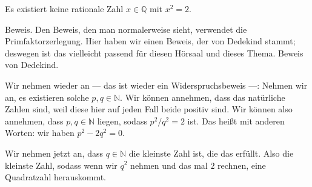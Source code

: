 \begin{math-stroke}
\begin{proposition}\label{prop:sqrt-2-irrational}
Es existiert keine rationale Zahl $x \in \mathbb{Q}$ mit $x^2 = 2$.
\end{proposition}
\end{math-stroke}

\begin{spoken-clean}[00:43:12 - 00:45:42]
Beweis. Den Beweis, den man normalerweise sieht, verwendet die Primfaktorzerlegung. Hier haben wir einen Beweis, der von Dedekind stammt; deswegen ist das vielleicht passend für diesen Hörsaal und dieses Thema. Beweis von Dedekind.

Wir nehmen wieder an --- das ist wieder ein Widerspruchsbeweis ---: Nehmen wir an, es existieren solche $p, q \in \mathbb{N}$. Wir können annehmen, dass das natürliche Zahlen sind, weil diese hier auf jeden Fall beide positiv sind. Wir können also annehmen, dass $p, q \in \mathbb{N}$ liegen, sodass $p^2 / q^2 = 2$ ist. Das heißt mit anderen Worten: wir haben $p^2 - 2q^2 = 0$.

Wir nehmen jetzt an, dass $q \in \mathbb{N}$ die kleinste Zahl ist, die das erfüllt. Also die kleinste Zahl, sodass wenn wir $q^2$ nehmen und das mal $2$ rechnen, eine Quadratzahl herauskommt.
\end{spoken-clean}

